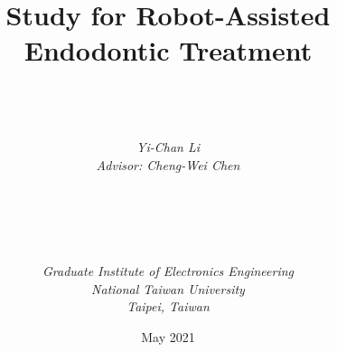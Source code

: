 \documentclass[a4paper, 12pt, twoside, openright]{mythesis}
\begin{document}
\title{\textbf{Study for Robot-Assisted Endodontic Treatment}}

\author{ \\  \\ \\
{\it Yi-Chan Li}\\
{\it Advisor: Cheng-Wei Chen} \\ \\ \\ \\  \\ \\
{\it Graduate Institute of Electronics Engineering}\\
{\it National Taiwan University} \\
{\it Taipei, Taiwan}\\ }

{\date{May 2021}}

\maketitle

\frontmatter

\tableofcontents
\listoffigures
\listoftables


\mainmatter












\end{document}
